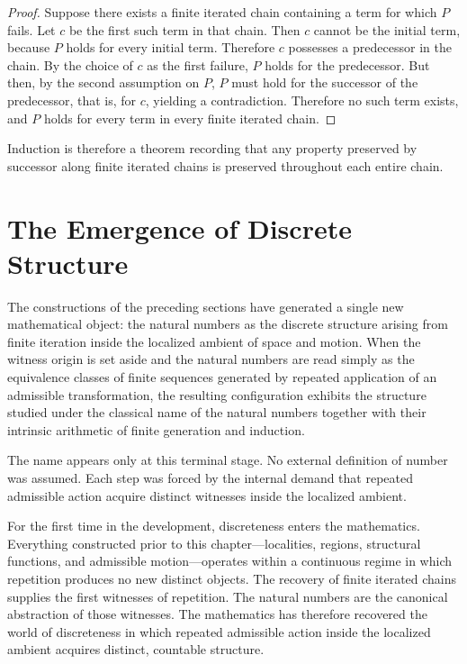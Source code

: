 \documentclass[12pt,anyside]{book}
\begin{document}
\begin{proof}
Suppose there exists a finite iterated chain containing a term for which $P$ fails. Let $c$ be the first such term in that chain. Then $c$ cannot be the initial term, because $P$ holds for every initial term. Therefore $c$ possesses a predecessor in the chain. By the choice of $c$ as the first failure, $P$ holds for the predecessor. But then, by the second assumption on $P$, $P$ must hold for the successor of the predecessor, that is, for $c$, yielding a contradiction. Therefore no such term exists, and $P$ holds for every term in every finite iterated chain.
\end{proof}

Induction is therefore a theorem recording that any property preserved by successor along finite iterated chains is preserved throughout each entire chain.

\section{The Emergence of Discrete Structure}
The constructions of the preceding sections have generated a single new mathematical object: the natural numbers as the discrete structure arising from finite iteration inside the localized ambient of space and motion. When the witness origin is set aside and the natural numbers are read simply as the equivalence classes of finite sequences generated by repeated application of an admissible transformation, the resulting configuration exhibits the structure studied under the classical name of the natural numbers together with their intrinsic arithmetic of finite generation and induction. 

The name appears only at this terminal stage. No external definition of number was assumed. Each step was forced by the internal demand that repeated admissible action acquire distinct witnesses inside the localized ambient.

For the first time in the development, discreteness enters the mathematics. Everything constructed prior to this chapter---localities, regions, structural functions, and admissible motion---operates within a continuous regime in which repetition produces no new distinct objects. The recovery of finite iterated chains supplies the first witnesses of repetition. The natural numbers are the canonical abstraction of those witnesses. The mathematics has therefore recovered the world of discreteness in which repeated admissible action inside the localized ambient acquires distinct, countable structure.
\end{document}
